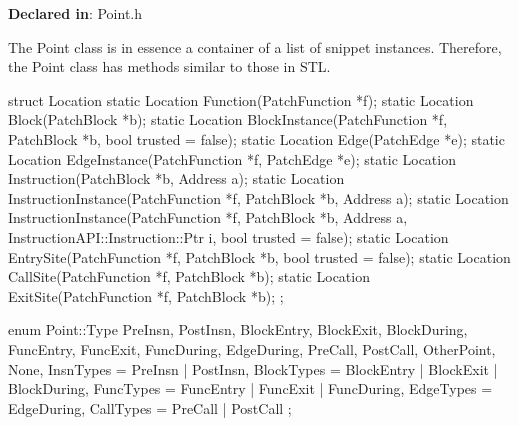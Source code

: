 \textbf{Declared in}: Point.h

The Point class is in essence a container of a list of snippet
instances. Therefore, the Point class has methods similar to those in STL.

\begin{apient}
struct Location {
   static Location Function(PatchFunction *f);
   static Location Block(PatchBlock *b);
   static Location BlockInstance(PatchFunction *f, PatchBlock *b, bool trusted = false);
   static Location Edge(PatchEdge *e);
   static Location EdgeInstance(PatchFunction *f, PatchEdge *e);
   static Location Instruction(PatchBlock *b, Address a);
   static Location InstructionInstance(PatchFunction *f, PatchBlock *b, Address a);
   static Location InstructionInstance(PatchFunction *f, PatchBlock *b, Address a,
                                       InstructionAPI::Instruction::Ptr i,
                                       bool trusted = false);
   static Location EntrySite(PatchFunction *f, PatchBlock *b, bool trusted = false);
   static Location CallSite(PatchFunction *f, PatchBlock *b);
   static Location ExitSite(PatchFunction *f, PatchBlock *b);
};
\end{apient}



\begin{apient}
enum Point::Type {
  PreInsn,
  PostInsn,
  BlockEntry,
  BlockExit,
  BlockDuring,
  FuncEntry,
  FuncExit,
  FuncDuring,
  EdgeDuring,
  PreCall,
  PostCall,
  OtherPoint,
  None,
  InsnTypes = PreInsn | PostInsn,
  BlockTypes = BlockEntry | BlockExit | BlockDuring,
  FuncTypes = FuncEntry | FuncExit | FuncDuring,
  EdgeTypes = EdgeDuring,
  CallTypes = PreCall | PostCall
};
\end{apient}

